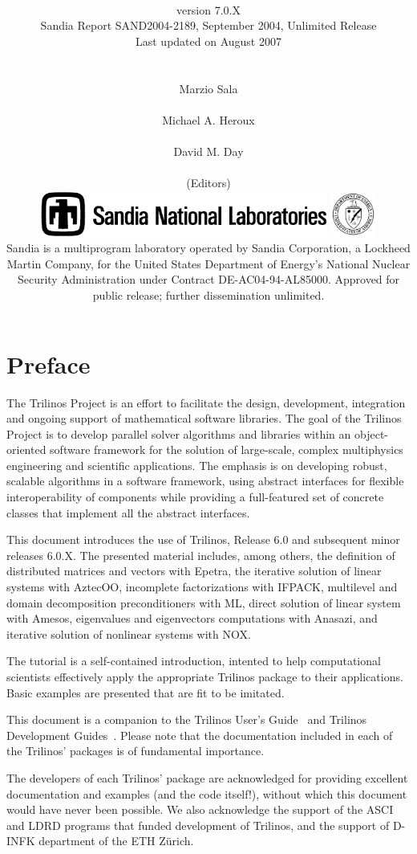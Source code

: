 \documentclass[final]{colabarticle}
\title{\textbf{\resizebox{10cm}{!}{Trilinos Tutorial}}\vspace{5mm}}
\subtitle{
  \\
  \vspace*{4mm}
  \Large version 7.0.X \\
  \vspace*{5mm}
  \noindent
  Sandia Report SAND2004-2189,
  September 2004,
  Unlimited Release \\
  \vspace*{5mm}
  \noindent
  Last updated on August 2007 \\
\vspace{6cm}\\
\\ \vspace{0mm}
\hspace*{1cm} Marzio Sala \\
\\ \vspace{0mm}
\hspace*{1cm} Michael A. Heroux\\
\\ \vspace{0mm}
\hspace*{1cm} David M. Day\\
\\ \vspace{0mm}
\hspace*{1cm} \normalsize (Editors) \\
\vspace*{1cm}
\vfill
\includegraphics[height=1.5cm]{snllineblk}  \hfill
\includegraphics[height=1.5cm]{DOEbwlogo}  \\
Sandia is a multiprogram laboratory operated by Sandia Corporation, 
a Lockheed Martin Company, for the United States Department of Energy's 
National Nuclear Security Administration under Contract DE-AC04-94-AL85000. 
Approved for public release; further dissemination unlimited. 
}
\newcommand{\Trilinos}{Trilinos}
\begin{document}
\maketitle

\chapter*{Preface}
  The Trilinos Project is an effort to facilitate the design,
  development, integration and ongoing support of mathematical software
  libraries.  The goal of the Trilinos Project is to develop parallel
  solver algorithms and libraries within an object-oriented software
  framework for the solution of large-scale, complex multiphysics
  engineering and scientific applications. The emphasis is on developing
  robust, scalable algorithms in a software framework, using abstract
  interfaces for flexible interoperability of components while providing
  a full-featured set of concrete classes that implement all the
  abstract interfaces.

  \medskip

  This document introduces the use of \Trilinos{}, Release 6.0 and 
  subsequent minor releases 6.0.X.  The
  presented material includes, among others, the definition of
  distributed matrices and vectors with Epetra, the iterative solution
  of linear systems with AztecOO, incomplete factorizations with IFPACK,
  multilevel and domain decomposition preconditioners with ML, direct
  solution of linear system with Amesos,
  eigenvalues and eigenvectors computations with Anasazi,
  and iterative solution of nonlinear systems with NOX.

  The tutorial is a self-contained introduction, intented to help
  computational scientists effectively apply the appropriate Trilinos
  package to their applications. Basic examples are presented that are
  fit to be imitated.

  \medskip

  This document is a companion to the Trilinos User's
  Guide~\cite{Trilinos-Users-Guide} and Trilinos Development
  Guides~\cite{Trilinos-Dev-Guide,Trilinos-Dev-Guide-II}. Please note
  that the documentation included in each of the Trilinos' packages is
  of fundamental importance.

  \bigskip

  The developers of each Trilinos' package are acknowledged for providing
  excellent documentation and examples (and the code itself!), 
  without which this document would have never been possible.  We also
  acknowledge the support of the ASCI and LDRD programs that funded
  development of Trilinos, and the support of D-INFK department of the ETH
  Z\"urich.
\end{document}
